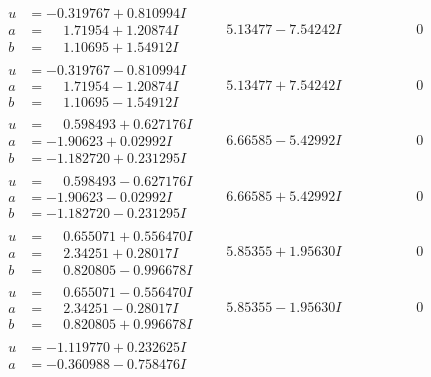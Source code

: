 \documentclass[1p]{elsarticle_modified}
\theoremstyle{definition}
\begin{document}
$$\begin{array}{c|c|c}
 \hline 
\begin{aligned}
u &= -0.319767 + 0.810994 I \\
a &= \phantom{-}1.71954 + 1.20874 I \\
b &= \phantom{-}1.10695 + 1.54912 I\end{aligned}
 & \phantom{-}5.13477 - 7.54242 I & \phantom{-0.000000 } 0 \\ \hline\begin{aligned}
u &= -0.319767 - 0.810994 I \\
a &= \phantom{-}1.71954 - 1.20874 I \\
b &= \phantom{-}1.10695 - 1.54912 I\end{aligned}
 & \phantom{-}5.13477 + 7.54242 I & \phantom{-0.000000 } 0 \\ \hline\begin{aligned}
u &= \phantom{-}0.598493 + 0.627176 I \\
a &= -1.90623 + 0.02992 I \\
b &= -1.182720 + 0.231295 I\end{aligned}
 & \phantom{-}6.66585 - 5.42992 I & \phantom{-0.000000 } 0 \\ \hline\begin{aligned}
u &= \phantom{-}0.598493 - 0.627176 I \\
a &= -1.90623 - 0.02992 I \\
b &= -1.182720 - 0.231295 I\end{aligned}
 & \phantom{-}6.66585 + 5.42992 I & \phantom{-0.000000 } 0 \\ \hline\begin{aligned}
u &= \phantom{-}0.655071 + 0.556470 I \\
a &= \phantom{-}2.34251 + 0.28017 I \\
b &= \phantom{-}0.820805 - 0.996678 I\end{aligned}
 & \phantom{-}5.85355 + 1.95630 I & \phantom{-0.000000 } 0 \\ \hline\begin{aligned}
u &= \phantom{-}0.655071 - 0.556470 I \\
a &= \phantom{-}2.34251 - 0.28017 I \\
b &= \phantom{-}0.820805 + 0.996678 I\end{aligned}
 & \phantom{-}5.85355 - 1.95630 I & \phantom{-0.000000 } 0 \\ \hline\begin{aligned}
u &= -1.119770 + 0.232625 I \\
a &= -0.360988 - 0.758476 I \\

\end{aligned}
\end{array}$$
\end{document}
